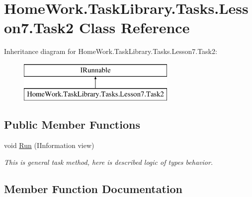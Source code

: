 \hypertarget{class_home_work_1_1_task_library_1_1_tasks_1_1_lesson7_1_1_task2}{}\section{Home\+Work.\+Task\+Library.\+Tasks.\+Lesson7.\+Task2 Class Reference}
\label{class_home_work_1_1_task_library_1_1_tasks_1_1_lesson7_1_1_task2}
Inheritance diagram for Home\+Work.\+Task\+Library.\+Tasks.\+Lesson7.\+Task2\+:\begin{figure}[H]
\begin{center}
\leavevmode
\includegraphics[height=2.000000cm]{class_home_work_1_1_task_library_1_1_tasks_1_1_lesson7_1_1_task2}
\end{center}
\end{figure}
\subsection*{Public Member Functions}
\begin{DoxyCompactItemize}
\item 
void \mbox{\hyperlink{class_home_work_1_1_task_library_1_1_tasks_1_1_lesson7_1_1_task2_afe3e5c87f1c7f715448aecf4ad7b8711}{Run}} (I\+Information view)
\begin{DoxyCompactList}\small\item\em This is general task method, here is described logic of types behavior. \end{DoxyCompactList}\end{DoxyCompactItemize}


\subsection{Member Function Documentation}
\mbox{\label{class_home_work_1_1_task_library_1_1_tasks_1_1_lesson7_1_1_task2_afe3e5c87f1c7f715448aecf4ad7b8711}} 

